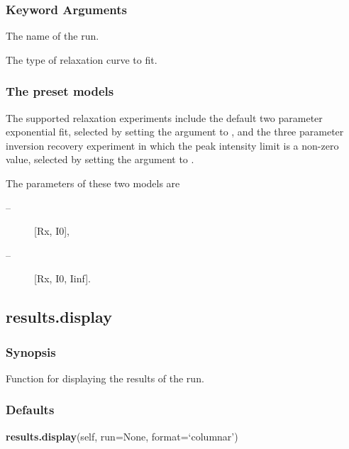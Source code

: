   
 \subsubsection{Keyword Arguments} 

   The name of the run.   

   The type of relaxation curve to fit.  

  

  
 \subsubsection{The preset models} 

 The supported relaxation experiments include the default two parameter exponential fit, selected by setting the  argument to , and the three parameter inversion recovery experiment in which the peak intensity limit is a non-zero value, selected by setting the argument to . 
  

 The parameters of these two models are 
  

 \begin{description} 
 \item[ --] [Rx, I0],  
 \item[ --] [Rx, I0, Iinf].  
 \end{description} 
  

  

 \newpage 

 \subsection{results.display} 

  
 \subsubsection{Synopsis} 

 Function for displaying the results of the run. 
  

  
 \subsubsection{Defaults} 

 \textsf{\textbf{results.display}(self, run=None, format=`columnar')} 

  
